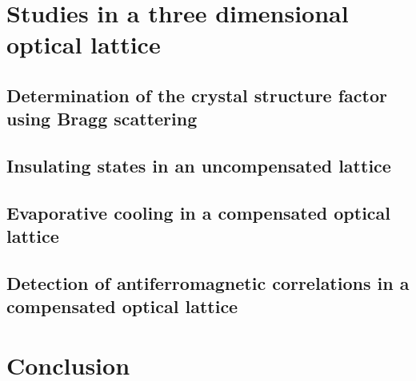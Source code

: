 \documentclass[oneside,11pt]{memoir}
\begin{document}
\chapter{Studies in a three dimensional optical lattice} 

\section{Determination of the crystal structure factor using Bragg scattering}
\section{Insulating states in an uncompensated lattice} 
\section{Evaporative cooling in a compensated optical lattice} 
\section{Detection of antiferromagnetic correlations in a compensated optical lattice}

\chapter{Conclusion} 
\end{document}
